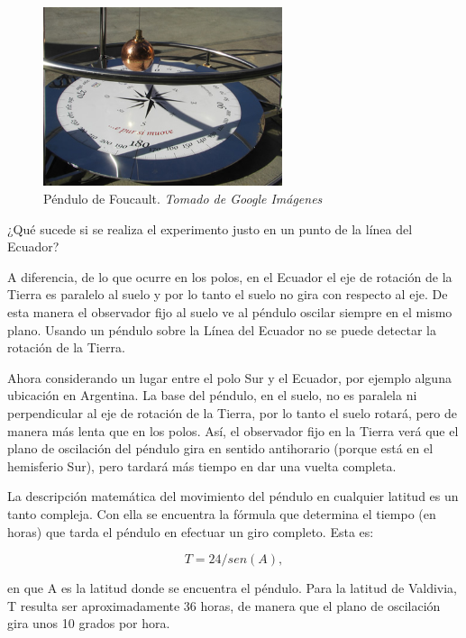 \documentclass[journal]{IEEEtran}
\begin{document}
\begin{center}
  \begin{figure}[h!]
  \includegraphics[width=70mm]{pendulo_fourt.jpg}
  \caption{Péndulo de Foucault. \emph{Tomado de Google Imágenes}}
  \end{figure}
\end{center}

¿Qué sucede si se realiza el experimento justo en un punto de la línea del Ecuador?

A diferencia, de lo que ocurre en los polos, en el Ecuador el eje de rotación de la Tierra es paralelo al suelo y por lo tanto el suelo no gira con respecto al eje. De esta manera el observador fijo al suelo ve al péndulo oscilar siempre en el mismo plano. Usando un péndulo sobre la Línea del Ecuador no se puede detectar la rotación de la Tierra.

Ahora considerando un lugar entre el polo Sur y el Ecuador, por ejemplo alguna ubicación en Argentina. La base del péndulo, en el suelo, no es paralela ni perpendicular al eje de rotación de la Tierra, por lo tanto el suelo rotará, pero de manera más lenta que en los polos. Así, el observador fijo en la Tierra verá que el plano de oscilación del péndulo gira en sentido antihorario (porque está en el hemisferio Sur), pero tardará más tiempo en dar una vuelta completa.

La descripción matemática del movimiento del péndulo en cualquier latitud es un tanto compleja. Con ella se encuentra la fórmula que determina el tiempo (en horas) que tarda el péndulo en efectuar un giro completo. Esta es:

\begin{equation}
    T=24/sen(A),
\end{equation}

en que A es la latitud donde se encuentra el péndulo. Para la latitud de Valdivia, T resulta ser aproximadamente 36 horas, de manera que el plano de oscilación gira unos 10 grados por hora.
\end{document}
